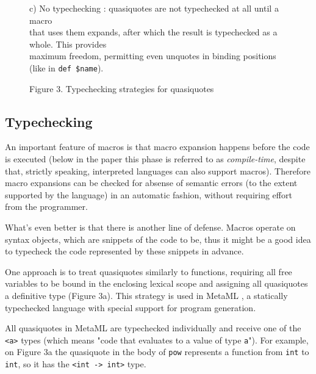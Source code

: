 \documentclass[10pt,journal,a4paper]{IEEEtran}
\begin{document}
\begin{figure*}[t]
\begin{listing}
\begin{adjustwidth}{2.5cm}{0pt}
c) No typechecking \cite{skalski04}: quasiquotes are not typechecked at all until a
macro\\ that uses them expands, after which the result is typechecked as a whole. This provides\\
maximum freedom, permitting even unquotes in binding positions
(like in \small \texttt{def \$name}\normalsize).
\end{adjustwidth}

\end{listing}
\end{figure*}

\begin{figure*}
\hskip5.48cm
\normalsize Figure 3. Typechecking strategies for quasiquotes
\end{figure*}

\subsection{Typechecking}

An important feature of macros is that macro expansion happens before the code is executed (below in
the paper this phase is referred to as \emph{compile-time}, despite that, strictly speaking, interpreted
languages can also support macros). Therefore macro expansions can be checked for
absense of semantic errors (to the extent supported by the language) in an automatic fashion,
without requiring effort from the programmer.

What's even better is that there is another line of defense.
Macros operate on syntax objects, which are snippets of the code to be,
thus it might be a good idea to typecheck the code represented by these snippets
in advance.

One approach is to treat quasiquotes similarly to functions, requiring all free variables
to be bound in the enclosing lexical scope and assigning all quasiquotes a definitive type (Figure 3a).
This strategy is used in MetaML \cite{taha99}, a statically typechecked
language with special support for program generation.

All quasiquotes in MetaML are typechecked individually
and receive one of the \small \texttt{<a>} \normalsize
types (which means "code that evaluates to a value of type \small \texttt{a}\normalsize").
For example, on Figure 3a the quasiquote in the body of \small \texttt{pow} \normalsize
represents a function from \small \texttt{int} \normalsize to \small \texttt{int}\normalsize, so it has the
\small \texttt{<int -> int>} \normalsize type.
\end{document}
